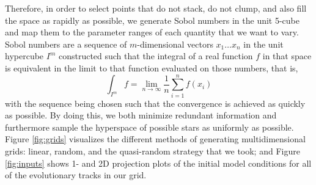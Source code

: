 \documentclass[manuscript]{aastex}
\begin{document}
Therefore, in order to select points that do not stack, do not clump, and also fill the space as rapidly as possible, we generate Sobol numbers \citep{sobol1967distribution} in the unit 5-cube and map them to the parameter ranges of each quantity that we want to vary. Sobol numbers are a sequence of $m$-dimensional vectors $x_1 \ldots x_n$ in the unit hypercube $I^m$ constructed such that the integral of a real function $f$ in that space is equivalent in the limit to that function evaluated on those numbers, that is,
\begin{equation}
    \int_{I^m} f = \lim_{n \to \infty} \frac{1}{n}\sum_{i=1}^n f(x_i)
\end{equation}
with the sequence being chosen such that the convergence is achieved as quickly as possible. By doing this, we both minimize redundant information and furthermore sample the hyperspace of possible stars as uniformly as possible. Figure \ref{fig:grids} visualizes the different methods of generating multidimensional grids: linear, random, and the quasi-random strategy that we took; and Figure \ref{fig:inputs} shows 1- and 2D projection plots of the initial model conditions for all of the evolutionary tracks in our grid. 

\begin{figure*}
    \centering
    \caption{Methods of generating multidimensional grids as portrayed via a unit cube projected onto a unit square. Linear (left), random (middle), and quasi-random (right) grids are generated in three dimensions, with color depicting the third dimension, i.e., the distance between the reader and the screen. Linear grids exhaust each dimension uniformly, but with all points stacked on top of each other, so the unit cube is filled very slowly and each point bears redundant information, which is why all of the (stacked) points appear black. Random grids fill the unit cube more rapidly, but points tend to clump up and leave large gaps in the parameter space. Quasi-random grids achieve the best of both worlds and fill the unit cube most rapidly by generating points that are maximally distant along all dimensions. From top to bottom, all three methods are shown with 100, 400, and 2000 points generated, respectively. }%
    \label{fig:grids}
\end{figure*}
\end{document}

